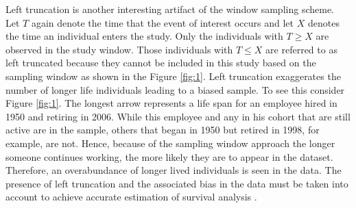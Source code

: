Left truncation is another interesting artifact of the window sampling scheme. Let $T$ again denote the time that the event of interest occurs and let $X$ denotes the time an individual enters the study. Only the individuals with $T \geq X$ are observed in the study window. Those individuals with $T \leq X$ are referred to as left truncated because they cannot be included in this study based on the sampling window as shown in the Figure \ref{fig:1}. Left truncation exaggerates the number of longer life individuals leading to a biased sample. To see this consider Figure \ref{fig:1}. The longest arrow represents a life span for an employee hired in 1950 and retiring in 2006. While this employee and any in his cohort that are still active are in the sample, others that began in 1950 but retired in 1998, for example, are not. Hence, because of the sampling window approach the longer someone continues working, the more likely they are to appear in the dataset. Therefore, an overabundance of longer lived individuals is seen in the data. The presence of left truncation and the associated bias in the data must be taken into account to achieve accurate estimation of survival analysis \citep{carrion2010}.

